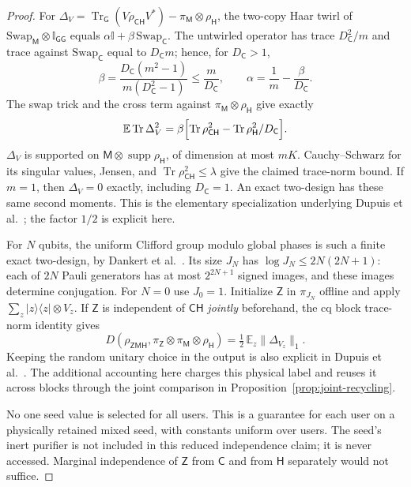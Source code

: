 \documentclass[11pt,a4paper]{article}
\numberwithin{equation}{section}
\theoremstyle{plain}
\theoremstyle{definition}
\DeclareMathOperator{\Tr}{Tr}
\DeclareMathOperator{\supp}{supp}
\newcommand{\rg}[1]{\mathsf{#1}}
\newcommand{\one}{\mathbb{I}}
\newcommand{\Dist}{D}                      %
\newcommand{\ketbra}[2]{\lvert #1 \rangle\langle #2 \rvert}
\begin{document}
\begin{proof}
For $\Delta_V=\Tr_{\rg{G}}(V\rho_{\rg{C}\rg{H}}V^*)
-\pi_{\rg{M}}\otimes\rho_{\rg{H}}$, the two-copy Haar twirl of
$\mathrm{Swap}_{\rg{M}}\otimes\one_{\rg{G}\rg{G}}$ equals
$\alpha\one+\beta\,\mathrm{Swap}_{\rg{C}}$. The untwirled operator has trace
$D_{\rg{C}}^2/m$ and trace against $\mathrm{Swap}_{\rg{C}}$ equal to
$D_{\rg{C}}m$; hence, for $D_{\rg{C}}>1$,
\[
\beta=\frac{D_{\rg{C}}(m^2-1)}{m(D_{\rg{C}}^2-1)}\le\frac{m}{D_{\rg{C}}},
\qquad \alpha=\frac{1}{m}-\frac{\beta}{D_{\rg{C}}}.
\]
The swap trick and the cross term against
$\pi_{\rg{M}}\otimes\rho_{\rg{H}}$ give exactly
\[
\mathbb{E}\Tr\Delta_V^2=\beta\Bigl[\Tr\rho_{\rg{C}\rg{H}}^2
-\Tr\rho_{\rg{H}}^2/D_{\rg{C}}\Bigr].
\]
$\Delta_V$ is supported on $\rg{M}\otimes\supp\rho_{\rg{H}}$, of dimension at
most $mK$. Cauchy--Schwarz for its singular values, Jensen, and
$\Tr\rho_{\rg{C}\rg{H}}^2\le\lambda$ give the claimed trace-norm bound. If
$m=1$, then $\Delta_V=0$ exactly, including $D_{\rg{C}}=1$. An exact
two-design has these same second moments. This is the elementary
specialization underlying Dupuis et al.\
\cite[Theorem 3.3 and Lemmas 3.4--3.5]{Dupuis2014}; the factor $1/2$ is
explicit here.

For $N$ qubits, the uniform Clifford group modulo global phases is such a
finite exact two-design, by Dankert et al.\
\cite[Theorem 1, pp.~2--3]{Dankert2009}. Its size
$J_N$ has $\log J_N\le 2N(2N+1)$: each of $2N$ Pauli generators has at most
$2^{2N+1}$ signed images, and these images determine conjugation. For $N=0$
use $J_0=1$. Initialize $\rg{Z}$ in $\pi_{J_N}$ offline and apply
$\sum_z\ketbra{z}{z}\otimes V_z$. If $\rg{Z}$ is independent of
$\rg{C}\rg{H}$ \emph{jointly} beforehand, the cq block trace-norm identity
gives
\[
\Dist(\rho_{\rg{Z}\rg{M}\rg{H}},
\pi_{\rg{Z}}\otimes\pi_{\rg{M}}\otimes\rho_{\rg{H}})
=\tfrac12\,\mathbb{E}_z\lVert\Delta_{V_z}\rVert_1 .
\]
Keeping the random unitary choice in the output is also explicit in Dupuis et al.\
\cite[discussion after Corollary 3.2]{Dupuis2014}. The additional accounting
here charges this physical label and reuses it across blocks through the joint
comparison in Proposition~\ref{prop:joint-recycling}.

No one seed value is selected for all users. This is a guarantee for each user
on a physically retained mixed seed, with constants uniform over users. The
seed's inert purifier is not included in this reduced independence claim; it
is never accessed. Marginal independence of $\rg{Z}$ from $\rg{C}$ and from
$\rg{H}$ separately would not suffice.
\end{proof}
\end{document}
